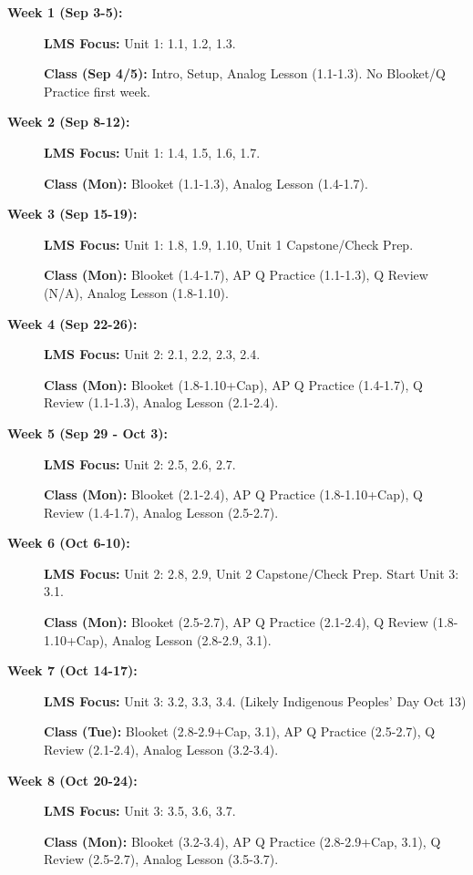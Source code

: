 \documentclass[11pt]{article}
\begin{document}
\begin{description}
  \item[\textbf{Week 1 (Sep 3-5):}] \textbf{LMS Focus:} Unit 1: 1.1, 1.2, 1.3.
  
  \textbf{Class (Sep 4/5):} Intro, Setup, Analog Lesson (1.1-1.3). No Blooket/Q Practice first week.
  
  \item[\textbf{Week 2 (Sep 8-12):}] \textbf{LMS Focus:} Unit 1: 1.4, 1.5, 1.6, 1.7.
  
  \textbf{Class (Mon):} Blooket (1.1-1.3), Analog Lesson (1.4-1.7).
  
  \item[\textbf{Week 3 (Sep 15-19):}] \textbf{LMS Focus:} Unit 1: 1.8, 1.9, 1.10, Unit 1 Capstone/Check Prep.
  
  \textbf{Class (Mon):} Blooket (1.4-1.7), AP Q Practice (1.1-1.3), Q Review (N/A), Analog Lesson (1.8-1.10).
  
  \item[\textbf{Week 4 (Sep 22-26):}] \textbf{LMS Focus:} Unit 2: 2.1, 2.2, 2.3, 2.4.
  
  \textbf{Class (Mon):} Blooket (1.8-1.10+Cap), AP Q Practice (1.4-1.7), Q Review (1.1-1.3), Analog Lesson (2.1-2.4).
  
  \item[\textbf{Week 5 (Sep 29 - Oct 3):}] \textbf{LMS Focus:} Unit 2: 2.5, 2.6, 2.7.
  
  \textbf{Class (Mon):} Blooket (2.1-2.4), AP Q Practice (1.8-1.10+Cap), Q Review (1.4-1.7), Analog Lesson (2.5-2.7).
  
  \item[\textbf{Week 6 (Oct 6-10):}] \textbf{LMS Focus:} Unit 2: 2.8, 2.9, Unit 2 Capstone/Check Prep. Start Unit 3: 3.1.
  
  \textbf{Class (Mon):} Blooket (2.5-2.7), AP Q Practice (2.1-2.4), Q Review (1.8-1.10+Cap), Analog Lesson (2.8-2.9, 3.1).
  
  \item[\textbf{Week 7 (Oct 14-17):}] \textbf{LMS Focus:} Unit 3: 3.2, 3.3, 3.4. (Likely Indigenous Peoples' Day Oct 13)
  
  \textbf{Class (Tue):} Blooket (2.8-2.9+Cap, 3.1), AP Q Practice (2.5-2.7), Q Review (2.1-2.4), Analog Lesson (3.2-3.4).
  
  \item[\textbf{Week 8 (Oct 20-24):}] \textbf{LMS Focus:} Unit 3: 3.5, 3.6, 3.7.
  
  \textbf{Class (Mon):} Blooket (3.2-3.4), AP Q Practice (2.8-2.9+Cap, 3.1), Q Review (2.5-2.7), Analog Lesson (3.5-3.7).
  

\end{description}
\end{document}
